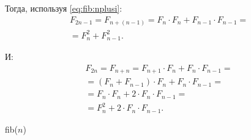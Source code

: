 \begin{frame}
    Тогда, используя \eqref{eq:fib:nplusi}:
    \begin{equation}\label{eq:fib:odd}
        \begin{split}
            F_{2n-1} = F_{n + (n-1)} = F_{n}\cdot F_{n} + F_{n-1}\cdot F_{n-1} = \\
            = F_{n}^2 + F_{n-1}^2.
        \end{split}
    \end{equation}

    И:
    \begin{equation}\label{eq:fib:even}
        \begin{split}
            F_{2n} = F_{n + n} = F_{n+1}\cdot F_{n} + F_{n}\cdot F_{n-1} = \\
            = (F_{n} + F_{n-1})\cdot F_{n} + F_{n}\cdot F_{n-1} = \\
            = F_{n}\cdot F_{n} + 2\cdot F_{n}\cdot F_{n-1} = \\
            = F_{n}^2 + 2\cdot F_{n}\cdot F_{n-1}.
        \end{split}
    \end{equation}
\end{frame}

\begin{frame}
    \begin{algorithm}[H]
        \caption{fib($n$)}
        \begin{algorithmic}[1]
            
            \ENDIF
        \end{algorithmic}
    \end{algorithm}
\end{frame}

